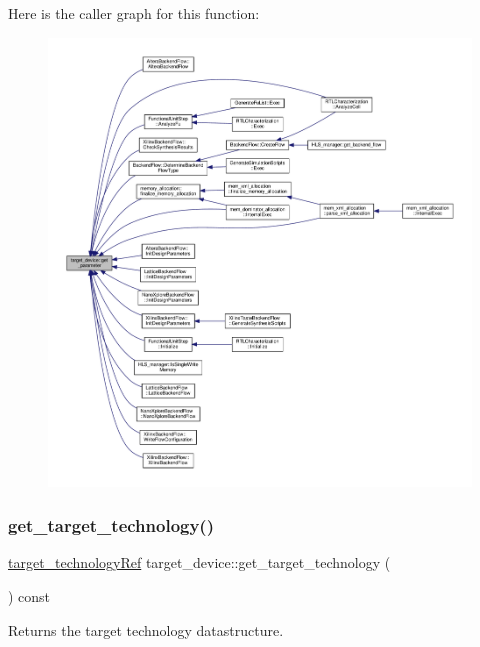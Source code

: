 Here is the caller graph for this function\+:
\nopagebreak
\begin{figure}[H]
\begin{center}
\leavevmode
\includegraphics[width=350pt]{d9/dd8/classtarget__device_a8661666c67663c3826ecd5f92f3e8711_icgraph}
\end{center}
\end{figure}
\mbox{\label{classtarget__device_afe3565642b50b7a6be23f7521c4d966e}} 
\subsubsection{\texorpdfstring{get\+\_\+target\+\_\+technology()}{get\_target\_technology()}}
{\footnotesize\ttfamily \hyperlink{target__technology_8hpp_a16af97aadc4eb998c2c9ec7fba5ccecd}{target\+\_\+technology\+Ref} target\+\_\+device\+::get\+\_\+target\+\_\+technology (\begin{DoxyParamCaption}{ }\end{DoxyParamCaption}) const}



Returns the target technology datastructure. 



